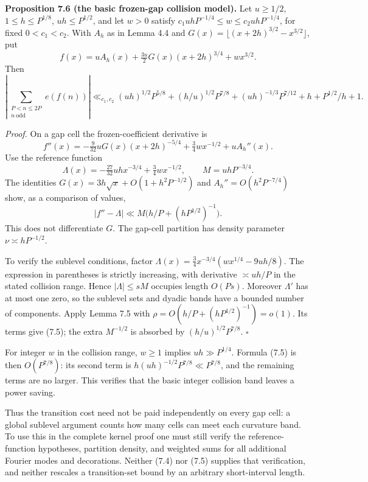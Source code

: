 \documentclass[11pt,a4paper]{article}
\begin{document}

\textbf{Proposition 7.6 (the basic frozen-gap collision model).} Let
\(u\ge1/2\), \(1\le h\le P^{1/8}\), \(uh\le P^{1/2}\), and let \(w>0\)
satisfy \(c_1uhP^{-1/4}\le w\le c_2uhP^{-1/4}\), for fixed
\(0<c_1<c_2\). With \(A_h\) as in Lemma 4.4 and
\(G(x)=\lfloor(x+2h)^{3/2}-x^{3/2}\rfloor\), put \[
f(x)=uA_h(x)+\tfrac{3u}{2}G(x)(x+2h)^{3/4}+wx^{3/2}.
\] Then \[
\left|\sum_{\substack{P<n\le2P\\n\ \mathrm{odd}}}e(f(n))\right|
\ll_{c_1,c_2}
(uh)^{1/2}P^{5/8}+(h/u)^{1/2}P^{7/8}
+(uh)^{-1/3}P^{7/12}+h+P^{1/2}/h+1.
\tag{7.5}
\]

\emph{Proof.} On a gap cell the frozen-coefficient derivative is \[
f''(x)=-\tfrac9{32}uG(x)(x+2h)^{-5/4}
+\tfrac34wx^{-1/2}+uA_h''(x).
\] Use the reference function \[
\Lambda(x)=-\tfrac{27}{32}uhx^{-3/4}+\tfrac34wx^{-1/2},
\qquad M=uhP^{-3/4}.
\] The identities \(G(x)=3h\sqrt x+O(1+h^2P^{-1/2})\) and
\(A_h''=O(h^2P^{-7/4})\) show, as a comparison of values, \[
|f''-\Lambda|\ll M\bigl(h/P+(hP^{1/2})^{-1}\bigr).
\] This does not differentiate \(G\). The gap-cell partition has density
parameter \(\nu\asymp hP^{-1/2}\).

To verify the sublevel conditions, factor
\(\Lambda(x)=\tfrac34x^{-3/4}(wx^{1/4}-9uh/8)\). The expression in
parentheses is strictly increasing, with derivative \(\asymp uh/P\) in
the stated collision range. Hence \(|\Lambda|\le sM\) occupies length
\(O(Ps)\). Moreover \(\Lambda'\) has at most one zero, so the sublevel
sets and dyadic bands have a bounded number of components. Apply Lemma
7.5 with \(\rho=O(h/P+(hP^{1/2})^{-1})=o(1)\). Its terms give (7.5); the
extra \(M^{-1/2}\) is absorbed by \((h/u)^{1/2}P^{7/8}\). \(\square\)

For integer \(w\) in the collision range, \(w\ge1\) implies
\(uh\gg P^{1/4}\). Formula (7.5) is then \(O(P^{7/8})\): its second term
is \(h(uh)^{-1/2}P^{7/8}\ll P^{7/8}\), and the remaining terms are no
larger. This verifies that the basic integer collision band leaves a
power saving.

Thus the transition cost need not be paid independently on every gap
cell: a global sublevel argument counts how many cells can meet each
curvature band. To use this in the complete kernel proof one must still
verify the reference-function hypotheses, partition density, and
weighted sums for all additional Fourier modes and decorations. Neither
(7.4) nor (7.5) supplies that verification, and neither rescales a
transition-set bound by an arbitrary short-interval length.
\end{document}
